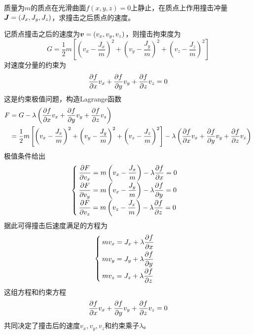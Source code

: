 \begin{example}
质量为$m$的质点在光滑曲面$f(x,y,z)=0$上静止，在质点上作用撞击冲量$\boldsymbol{J} = (J_x,J_y,J_z)$，求撞击之后质点的速度。
\end{example}
\begin{solution}
记质点撞击之后的速度为$\boldsymbol{v} = (v_x,v_y,v_z)$，则撞击拘束度为
\begin{equation*}
	G = \frac12 m\left[\left(v_x-\frac{J_x}{m}\right)^2 + \left(v_y-\frac{J_y}{m}\right)^2 + \left(v_z-\frac{J_z}{m}\right)^2 \right]
\end{equation*}
对速度分量的约束为
\begin{equation*}
	\dfrac{\partial f}{\partial x}v_x + \dfrac{\partial f}{\partial y}v_y + \dfrac{\partial f}{\partial z}v_z = 0
\end{equation*}
这是约束极值问题，构造Lagrange函数
\begin{align*}
	F & = G-\lambda\left(\dfrac{\partial f}{\partial x}v_x + \dfrac{\partial f}{\partial y}v_y + \dfrac{\partial f}{\partial z}v_z\right) \\
	& = \frac12 m\left[\left(v_x-\frac{J_x}{m}\right)^2 + \left(v_y-\frac{J_y}{m}\right)^2 + \left(v_z-\frac{J_z}{m}\right)^2 \right] - \lambda\left(\dfrac{\partial f}{\partial x}v_x + \dfrac{\partial f}{\partial y}v_y + \dfrac{\partial f}{\partial z}v_z\right)
\end{align*}
极值条件给出
\begin{equation*}
\begin{cases}
	\displaystyle \dfrac{\partial F}{\partial v_x} = m\left(v_x-\frac{J_x}{m}\right)- \lambda\dfrac{\partial f}{\partial x} = 0 \\[1.5ex]
	\displaystyle \dfrac{\partial F}{\partial v_y} = m\left(v_x-\frac{J_y}{m}\right)- \lambda\dfrac{\partial f}{\partial y} = 0 \\[1.5ex]
	\displaystyle \dfrac{\partial F}{\partial v_z} = m\left(v_z-\frac{J_z}{m}\right)- \lambda\dfrac{\partial f}{\partial z} = 0
\end{cases}
\end{equation*}
据此可得撞击后速度满足的方程为
\begin{equation*}
\begin{cases}
	mv_x = J_x+\lambda\dfrac{\partial f}{\partial x} \\[1.5ex]
	mv_y = J_y+\lambda\dfrac{\partial f}{\partial y} \\[1.5ex]
	mv_z = J_z+\lambda\dfrac{\partial f}{\partial z}
\end{cases}
\end{equation*}
这组方程和约束方程
\begin{equation*}
	\dfrac{\partial f}{\partial x}v_x + \dfrac{\partial f}{\partial y}v_y + \dfrac{\partial f}{\partial z}v_z = 0
\end{equation*}
共同决定了撞击后的速度$v_x,v_y,v_z$和约束乘子$\lambda$。
\end{solution}


